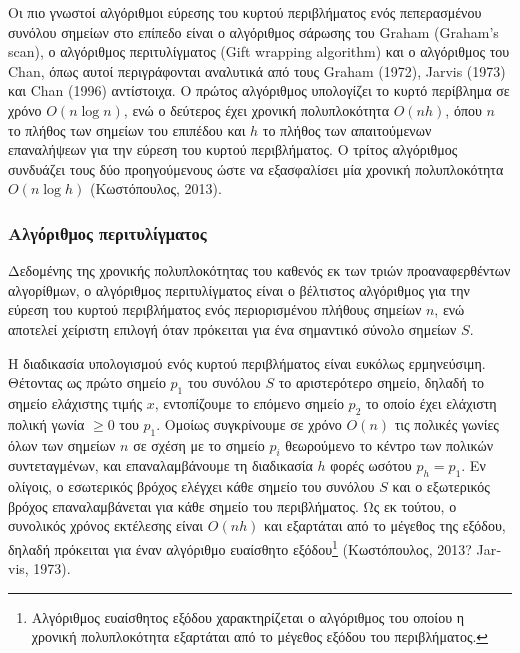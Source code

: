 Οι πιο γνωστοί αλγόριθμοι εύρεσης του κυρτού περιβλήματος ενός πεπερασμένου συνόλου σημείων στο επίπεδο είναι ο αλγόριθμος σάρωσης του \textlatin{Graham (Graham’s scan}), ο αλγόριθμος περιτυλίγματος (\textlatin{Gift wrapping algorithm}) και ο αλγόριθμος του \textlatin{Chan},  όπως αυτοί περιγράφονται αναλυτικά από τους \textlatin{Graham (1972), Jarvis (1973)} και \textlatin{Chan (1996)} αντίστοιχα. Ο πρώτος αλγόριθμος υπολογίζει το κυρτό περίβλημα σε χρόνο $O(n \log n)$, ενώ ο δεύτερος έχει χρονική πολυπλοκότητα $O(nh)$, όπου $n$ το πλήθος των σημείων του επιπέδου και $h$ το πλήθος των απαιτούμενων επαναλήψεων για την εύρεση του κυρτού περιβλήματος. Ο τρίτος αλγόριθμος συνδυάζει τους δύο προηγούμενους ώστε να εξασφαλίσει μία χρονική πολυπλοκότητα $O(n \log h)$ (Κωστόπουλος, 2013).

\subsubsection{Αλγόριθμος περιτυλίγματος}
Δεδομένης της χρονικής πολυπλοκότητας του καθενός εκ των τριών προαναφερθέντων αλγορίθμων, ο αλγόριθμος περιτυλίγματος είναι ο βέλτιστος αλγόριθμος για την εύρεση του κυρτού περιβλήματος ενός περιορισμένου πλήθους σημείων $n$, ενώ αποτελεί χείριστη επιλογή όταν πρόκειται για ένα σημαντικό σύνολο σημείων $S$. \par

Η διαδικασία υπολογισμού ενός κυρτού περιβλήματος είναι ευκόλως ερμηνεύσιμη. Θέτοντας ως πρώτο σημείο $p_1$ του συνόλου $S$ το αριστερότερο σημείο, δηλαδή το σημείο ελάχιστης τιμής $x$, εντοπίζουμε το επόμενο σημείο $p_2$ το οποίο έχει ελάχιστη πολική γωνία $\geq 0$ του $p_1$. Ομοίως συγκρίνουμε σε χρόνο $O(n)$ τις πολικές γωνίες όλων των σημείων $n$ σε σχέση με το σημείο $p_i$ θεωρούμενο το κέντρο των πολικών συντεταγμένων, και επαναλαμβάνουμε τη διαδικασία $h$ φορές ωσότου $p_h=p_1$. Εν ολίγοις, ο εσωτερικός βρόχος ελέγχει κάθε σημείο του συνόλου $S$ και ο εξωτερικός βρόχος επαναλαμβάνεται για κάθε σημείο του περιβλήματος. Ως εκ τούτου, ο συνολικός χρόνος εκτέλεσης είναι $O(nh)$ και εξαρτάται από το μέγεθος της εξόδου, δηλαδή πρόκειται για έναν αλγόριθμο ευαίσθητο εξόδου\footnote{Αλγόριθμος ευαίσθητος εξόδου χαρακτηρίζεται ο αλγόριθμος του οποίου η χρονική πολυπλοκότητα εξαρτάται από το μέγεθος εξόδου του περιβλήματος.} (Κωστόπουλος, 2013? \textlatin{Jarvis, 1973}). \par

\pagebreak